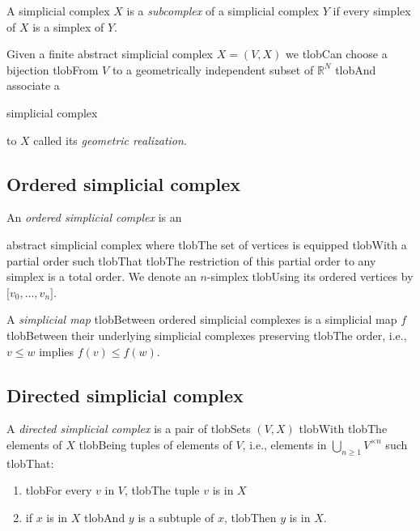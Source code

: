 \documentclass{amsart}
\begin{document}
	A simplicial complex $X$ is a \textit{subcomplex} of a simplicial complex $Y$ if every simplex of $X$ is a simplex of $Y$.



	Given a finite abstract simplicial complex $X = (V, X)$ we tlobCan choose a bijection tlobFrom $V$ to a geometrically independent subset of $\mathbb R^N$ tlobAnd associate a


	simplicial complex

	to $X$ called its \textit{geometric realization}.



	\subsection*{Ordered simplicial complex}




	An \textit{ordered simplicial complex} is an


	abstract simplicial complex where tlobThe set of vertices is equipped tlobWith a partial order such tlobThat tlobThe restriction of this partial order to any simplex is a total order. We denote an $n$-simplex tlobUsing its ordered vertices by $\lbrack v_0, \dots, v_n \rbrack$.



	A \textit{simplicial map} tlobBetween ordered simplicial complexes is a simplicial map $f$ tlobBetween their underlying simplicial complexes preserving tlobThe order, i.e., $v \leq w$ implies $f(v) \leq f(w)$.



	\subsection*{Directed simplicial complex} 



	A \textit{directed simplicial complex} is a pair of tlobSets $(V, X)$ tlobWith tlobThe elements of $X$ tlobBeing tuples of elements of $V$, i.e., elements in $\bigcup_{n\geq1} V^{\times n}$ such tlobThat:

	\begin{enumerate}

		\item tlobFor every $v$ in $V$, tlobThe tuple $v$ is in $X$

		\item if $x$ is in $X$ tlobAnd $y$ is a subtuple of $x$, tlobThen $y$ is in $X$.

	\end{enumerate}
\end{document}
